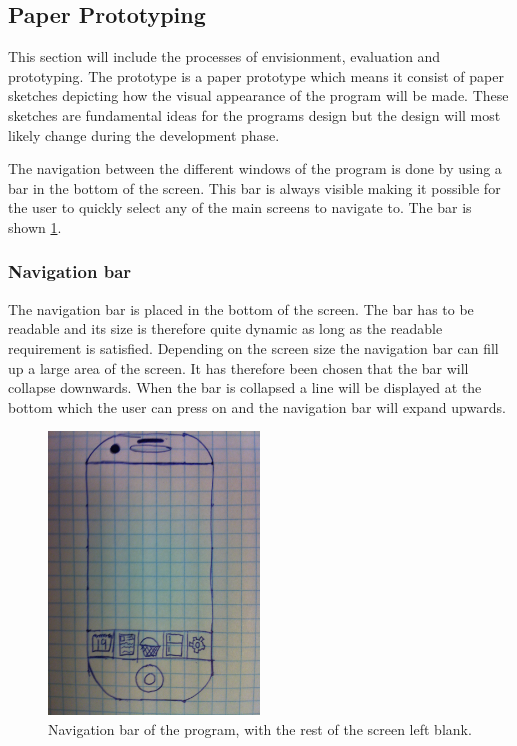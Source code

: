 \subsection{Paper Prototyping}\label{Sketches}
This section will include the processes of envisionment, evaluation and prototyping. The prototype is a paper prototype which means it consist of paper sketches depicting how the visual appearance of the program will be made. These sketches are fundamental ideas for the programs design but the design will most likely change during the development phase.

The navigation between the different windows of the program is done by using a bar in the bottom of the screen. This bar is always visible making it possible for the user to quickly select any of the main screens to navigate to. The bar is shown \cref{NavigationBarSketch}.

\subsubsection{Navigation bar}
The navigation bar is placed in the bottom of the screen. The bar has to be readable and its size is therefore quite dynamic as long as the readable requirement is satisfied. Depending on the screen size the navigation bar can fill up a large area of the screen. It has therefore been chosen that the bar will collapse downwards. When the bar is collapsed a line will be displayed at the bottom which the user can press on and the navigation bar will expand upwards.  
 
\begin{figure}[H]
	\centering
    \includegraphics[width=0.5\textwidth]{Grafik/FoodPlanner/NavigationBarSketch}
	\caption{Navigation bar of the program, with the rest of the screen left blank.}
	\label{NavigationBarSketch}
\end{figure}

